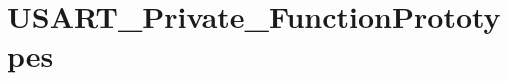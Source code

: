 \hypertarget{group___u_s_a_r_t___private___function_prototypes}{}\section{U\+S\+A\+R\+T\+\_\+\+Private\+\_\+\+Function\+Prototypes}
\label{group___u_s_a_r_t___private___function_prototypes}
